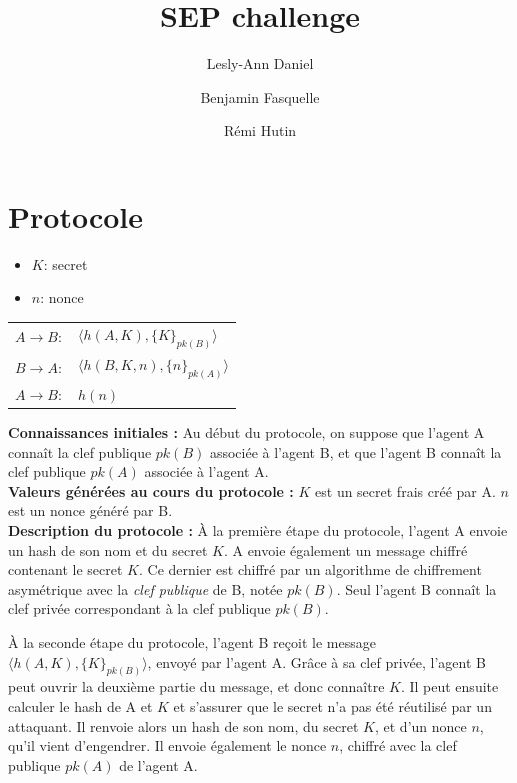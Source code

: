 \documentclass[10pt,a4paper]{article}
\author{Lesly-Ann Daniel \and Benjamin Fasquelle \and Rémi Hutin}
\title{SEP challenge}
\begin{document}
\maketitle


\section{Protocole}

\begin{itemize}
\item $K$: secret
\item $n$: nonce
\end{itemize}

\begin{table}[!h]
\centering
\begin{tabular}{ll}
$A \rightarrow B:$ & $\langle h(A, K), \{K\}_{pk(B)} \rangle $ \\
$B \rightarrow A:$ & $\langle h(B, K, n), \{n\}_{pk(A)} \rangle $\\
$A \rightarrow B:$ & $h(n)$\\
\end{tabular}
\end{table}

\textbf{Connaissances initiales :} 
Au début du protocole, on suppose que l'agent A connaît la clef publique $pk(B)$ associée à l'agent B,
et que l'agent B connaît la clef publique $pk(A)$ associée à l'agent A. \\

\textbf{Valeurs générées au cours du protocole :} 
$K$ est un secret frais créé par A.
$n$ est un nonce généré par B.\\

\textbf{Description du protocole :}
À la première étape du protocole, l'agent A envoie un hash de son nom et du secret $K$. 
A envoie également un message chiffré contenant le secret $K$. 
Ce dernier est chiffré par un algorithme de chiffrement asymétrique avec la \emph{clef publique} de B, notée $pk(B)$.
Seul l'agent B connaît la clef privée correspondant à la clef publique $pk(B)$. 

À la seconde étape du protocole, l'agent B reçoit le message $\langle h(A, K), \{K\}_{pk(B)} \rangle $, envoyé par l'agent A.
Grâce à sa clef privée, l'agent B peut ouvrir la deuxième partie du message, et donc connaître $K$.
Il peut ensuite calculer le hash de A et $K$ et s'assurer que le secret n'a pas été réutilisé par un attaquant.
Il renvoie alors un hash de son nom, du secret $K$, et d'un nonce $n$, qu'il vient d'engendrer.
Il envoie également le nonce $n$, chiffré avec la clef publique $pk(A)$ de l'agent A.
\end{document}
